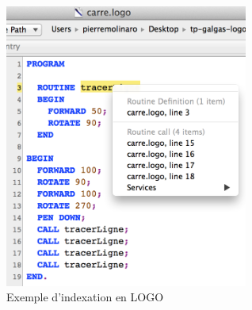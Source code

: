 \begin{figure}[t]
  \centering
  \includegraphics[width=8cm]{chapter-cocoa-features/exemple-indexation-logo.png}
  \caption{Exemple d'indexation en LOGO}
  \ligne
\end{figure}



%
%
%
%
%
%
%
%
%
%
%
%
%
%
%
%







